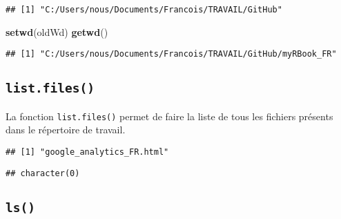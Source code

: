 \documentclass[]{book}
\newenvironment{Shaded}{\begin{snugshade}}{\end{snugshade}}
\newcommand{\KeywordTok}[1]{\textcolor[rgb]{0.13,0.29,0.53}{\textbf{#1}}}
\newcommand{\DataTypeTok}[1]{\textcolor[rgb]{0.13,0.29,0.53}{#1}}
\newcommand{\StringTok}[1]{\textcolor[rgb]{0.31,0.60,0.02}{#1}}
\newcommand{\CommentTok}[1]{\textcolor[rgb]{0.56,0.35,0.01}{\textit{#1}}}
\newcommand{\NormalTok}[1]{#1}
\theoremstyle{definition}
\theoremstyle{definition}
\theoremstyle{definition}
\theoremstyle{remark}
\begin{document}
\begin{verbatim}
## [1] "C:/Users/nous/Documents/Francois/TRAVAIL/GitHub"
\end{verbatim}

\begin{Shaded}
\begin{Highlighting}[]
\KeywordTok{setwd}\NormalTok{(oldWd)}
\KeywordTok{getwd}\NormalTok{()}
\end{Highlighting}
\end{Shaded}

\begin{verbatim}
## [1] "C:/Users/nous/Documents/Francois/TRAVAIL/GitHub/myRBook_FR"
\end{verbatim}

\subsection{\texorpdfstring{\texttt{list.files()}}{list.files()}}\label{l015listfiles}

La fonction \texttt{list.files()} permet de faire la liste de tous les
fichiers présents dans le répertoire de travail.

\begin{Shaded}
\end{Shaded}

\begin{verbatim}
## [1] "google_analytics_FR.html"
\end{verbatim}

\begin{Shaded}
\end{Shaded}

\begin{verbatim}
## character(0)
\end{verbatim}

\subsection{\texorpdfstring{\texttt{ls()}}{ls()}}\label{l015ls}
\end{document}
